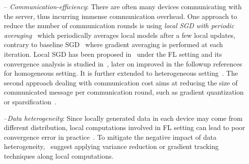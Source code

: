 \documentclass[sigconf, anonymous, review]{acmart}
\begin{document}
-- \emph{Communication-efficiency}: There are often many devices communicating with the server, thus incurring immense communication overhead. 
One approach to reduce the number of communication rounds is using \emph{local SGD with periodic averaging}~\citep{zhou2018convergence,stich2019local,yu2019parallel,wang2018cooperative} which periodically averages local models after a few local updates, contrary to baseline SGD~\citep{bottou-bousquet-2008} where gradient averaging is performed at each iteration.
Local SGD has been proposed in~\citep{mcmahan2016communication,konevcny2016federated} under the FL setting and its convergence analysis is studied in~\citep{stich2019local,wang2018cooperative,zhou2018convergence,yu2019parallel}, later on improved in the followup references~\citep{basu2019qsparse,haddadpour2019convergence,bayoumi2020tighter,stich2019error} for homogeneous setting. 
It is further extended to heterogeneous setting~\citep{sahu2018convergence,haddadpour2019convergence,karimireddy2019scaffold,yu2019linear,li2019convergence,liang2019variance}. The second approach dealing with communication cost aims at reducing the size of communicated message per communication round, such as gradient quantization~\citep{alistarh2017qsgd,bernstein2018signsgd,tang2018communication,wen2017terngrad,wu2018error} or sparsification~\citep{stich2018sparsified,alistarh2018convergence,lin2017deep,stich2019error}. 


--\emph{Data heterogeneity}: 
Since locally generated data in each device may come from different distribution, local computations involved in FL setting can lead to poor convergence error in practice~\citep{li2019federated,liang2019variance}. 
To mitigate the negative impact of data heterogeneity,~\citep{horvath2019stochastic,liang2019variance,karimireddy2019scaffold,haddadpour2020federated} suggest applying variance reduction or gradient tracking techniques along local computations.
\end{document}

